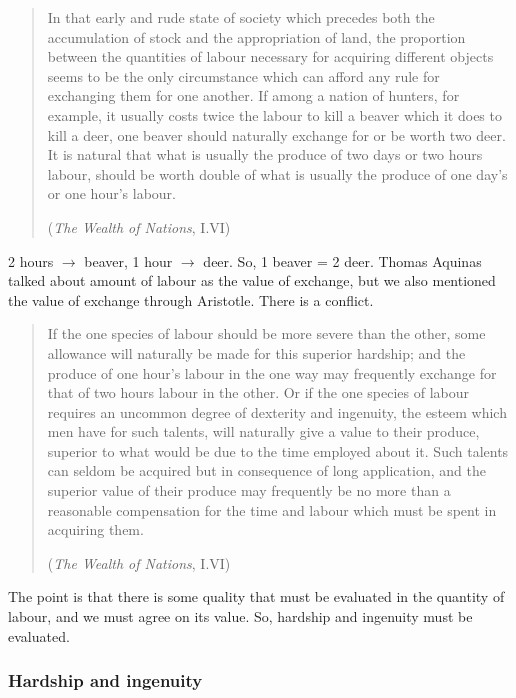             \begin{quote}
                In that early and rude state of society which precedes both the accumulation of stock and the appropriation of land, the proportion between the quantities of labour necessary for acquiring different objects seems to be the only circumstance which can afford any rule for exchanging them for one another. If among a nation of hunters, for example, it usually costs twice the labour to kill a beaver which it does to kill a deer, one beaver should naturally exchange for or be worth two deer. It is natural that what is usually the produce of two days or two hours labour, should be worth double of what is usually the produce of one day’s or one hour’s labour.
    
                (\textit{The Wealth of Nations}, I.VI)
            \end{quote} 

            2 hours \(\rightarrow\) beaver, 1 hour \(\rightarrow\) deer. So, 1 beaver = 2 deer. Thomas Aquinas talked about amount of labour as the value of exchange, but we also mentioned the value of exchange through Aristotle. There is a conflict.
    
            \begin{quote}
                If the one species of labour should be more severe than the other, some allowance will naturally be made for this superior hardship; and the produce of one hour’s labour in the one way may frequently exchange for that of two hours labour in the other. Or if the one species of labour requires an uncommon degree of dexterity and ingenuity, the esteem which men have for such talents, will naturally give a value to their produce, superior to what would be due to the time employed about it. Such talents can seldom be acquired but in consequence of long application, and the superior value of their produce may frequently be no more than a reasonable compensation for the time and labour which must be spent in acquiring them.
    
                (\textit{The Wealth of Nations}, I.VI)
            \end{quote}

            The point is that there is some quality that must be evaluated in the quantity of labour, and we must agree on its value. So, hardship and ingenuity must be evaluated.

        \subsubsection{Hardship and ingenuity}

